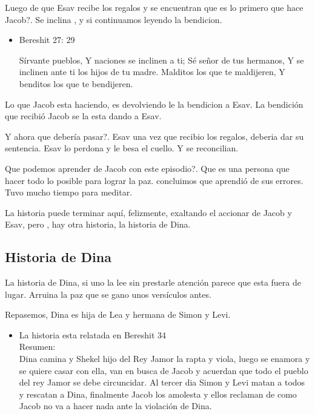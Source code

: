 \documentclass[conference]{IEEEtran}
\begin{document}
Luego de que Esav recibe los regalos  y se encuentran que es lo primero que hace Jacob?. Se inclina , y si continuamos leyendo la bendicion.

\begin{itemize}


\item Bereshit 27: 29

Sírvante pueblos,
Y naciones se inclinen a ti;
Sé señor de tus hermanos,
Y se inclinen ante ti los hijos de tu madre.
Malditos los que te maldijeren,
Y benditos los que te bendijeren.


\end{itemize}


Lo que Jacob esta haciendo, es devolviendo le la bendicion a Esav. La bendición que recibió Jacob se la esta dando a Esav. 


Y ahora que debería pasar?. Esav una vez que recibio los regalos, deberia dar su sentencia. Esav lo perdona y le besa el cuello. Y se reconcilian.


Que podemos aprender de Jacob con este episodio?. Que es una persona que hacer todo lo posible para lograr la paz. 
concluimos que aprendió de sus errores. Tuvo mucho tiempo para meditar.



La historia puede terminar aquí, felizmente, exaltando el accionar de Jacob y Esav, pero , hay otra historia,  la historia de Dina.

\pagebreak
\subsection{Historia de Dina}
La historia de Dina, si uno la lee sin prestarle atención parece que esta fuera de lugar. Arruina la paz que se gano unos versículos antes.

Repasemos, Dina es hija de Lea y hermana de Simon y Levi.

\begin{itemize}
\item La historia esta relatada en Bereshit 34\\
Resumen:\\
Dina camina y Shekel hijo del Rey Jamor la rapta y viola, luego se enamora  
y se quiere casar con ella, van en busca de Jacob y acuerdan que todo el pueblo del rey Jamor se debe circuncidar.
Al tercer dia Simon y Levi matan a todos y rescatan a Dina, finalmente Jacob los amolesta y ellos reclaman de como Jacob no va a hacer nada ante la violación de Dina.
\end{itemize}
\end{document}
